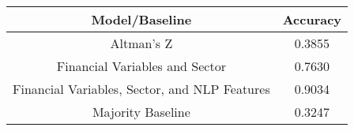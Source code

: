\footnotesize
\begin{tabular}{cc}
\toprule
Model/Baseline & Accuracy \\
\midrule
Altman's Z & 0.3855 \\
Financial Variables and Sector & 0.7630 \\
Financial Variables, Sector, and NLP Features & 0.9034 \\
Majority Baseline & 0.3247 \\
\bottomrule
\end{tabular}

\normalsize